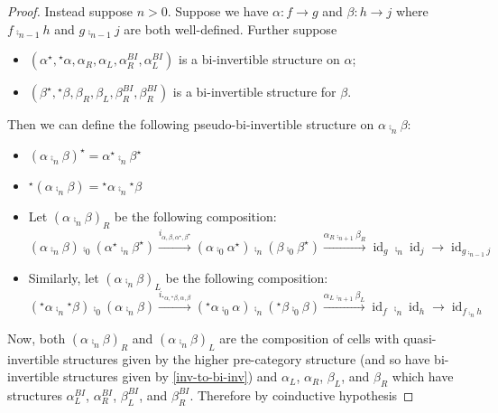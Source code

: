 \documentclass[draft]{article}
\DeclareMathOperator{\id}{id}
\newcommand{\linv}[1]{{}^\star\!#1} \newcommand{\rinv}[1]{#1^\star}
\begin{document}
\begin{proof}
    Instead suppose \(n > 0\). Suppose we have \(\alpha: f \to g\) and \(\beta: h
    \to j\) where \(f \comp_{n-1} h\) and \(g \comp_{n-1} j\) are both
    well-defined. Further suppose
    \begin{itemize}
    \item \((\rinv \alpha, \linv \alpha, \alpha_R, \alpha_L,
      \alpha_R^{BI}, \alpha_L^{BI})\) is a bi-invertible structure on
      \(\alpha\);
    \item \((\rinv \beta, \linv \beta, \beta_R, \beta_L, \beta_R^{BI},
      \beta_R^{BI})\) is a bi-invertible structure for \(\beta\).
    \end{itemize}
    Then we can define the following pseudo-bi-invertible structure on
    \(\alpha \comp_n \beta\):
    \begin{itemize}
    \item \(\rinv {(\alpha \comp_n \beta)} = \rinv \alpha \comp_n
      \rinv \beta\)
    \item \(\linv {(\alpha \comp_n \beta)} = \linv \alpha \comp_n
      \linv \beta\)
    \item Let \({(\alpha \comp_n \beta)}_R\) be the following
      composition:
      \begin{equation*}
        (\alpha \comp_n \beta) \comp_0 (\rinv \alpha \comp_n \rinv \beta) \overset {i_{\alpha,\beta,\rinv \alpha, \rinv \beta}} \to (\alpha \comp_0 \rinv \alpha) \comp_n (\beta \comp_0 \rinv \beta) \overset {\alpha_R \comp_{n+1} \beta_R} \to \id_g \comp_n \id_j \to \id_{g \comp_{n-1} j}
      \end{equation*}
    \item Similarly, let \({(\alpha \comp_n \beta)}_L\) be the
      following composition:
      \begin{equation*}
        (\linv \alpha \comp_n \linv \beta) \comp_0 (\alpha \comp_n \beta) \overset {i_{\linv \alpha, \linv \beta, \alpha, \beta}} \to (\linv \alpha \comp_0 \alpha) \comp_n (\linv \beta \comp_0 \beta) \overset {\alpha _L \comp_{n+1} \beta _L} \to \id_f \comp_n \id_h \to \id_{f \comp_n h}
      \end{equation*}
    \end{itemize}
    Now, both \({(\alpha \comp_n \beta)}_R\) and \({(\alpha \comp_n
      \beta)}_L\) are the composition of cells with quasi-invertible
    structures given by the higher pre-category structure (and so have
    bi-invertible structures given by \cref{inv-to-bi-inv}) and
    \(\alpha_L\), \(\alpha_R\), \(\beta_L\), and \(\beta_R\) which
    have structures \(\alpha_L^{BI}\), \(\alpha_R^{BI}\),
    \(\beta_L^{BI}\), and \(\beta_R^{BI}\). Therefore by coinductive
    hypothesis
\end{proof}
\end{document}
